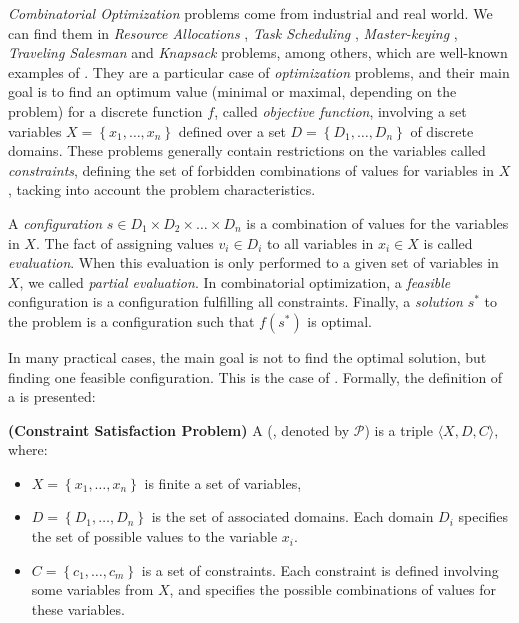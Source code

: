 \textit{Combinatorial Optimization} problems come from industrial and real world. We can find them in {\it Resource Allocations} \cite{Akplogan2011}, \textit{Task Scheduling} \cite{Sibbesen2008}, \textit{Master-keying} \cite{Espelage2000}, \textit{Traveling Salesman} and \textit{Knapsack} problems, among others, which are well-known examples of \cops{} \cite{Smith2005}. They are a particular case of \textit{optimization} problems, and their main goal is to find an optimum value (minimal or maximal, depending on the problem) for a discrete function $f$, called \textit{objective function}, involving a set variables $X = \left\{x_1, \dots, x_n\right\}$ defined over a set $D = \left\{D_1, \dots, D_n\right\}$ of discrete domains. These problems generally contain restrictions on the variables called \textit{constraints}, defining the set of forbidden combinations of values for variables in $X$, tacking into account the problem characteristics.

A \textit{configuration} $s\in D_1\times D_2\times\dots\times D_n$ is a combination of values for the variables in $X$. The fact of assigning values $v_i \in D_i$ to all variables in $x_i \in X$ is called \textit{evaluation}. When this evaluation is only performed to a given set of variables in $X$, we called \textit{partial evaluation}. In combinatorial optimization, a \textit{feasible} configuration is a configuration fulfilling all constraints. Finally, a \textit{solution} $s^*$ to the problem is a configuration such that $f(s^*)$ is optimal.

In many practical cases, the main goal is not to find the optimal solution, but finding one feasible configuration. This is the case of \CSPs. Formally, the definition of a \csp{} is presented: 

\begin{definition}{\bf (Constraint Satisfaction Problem)}
\label{def:csp}
A \CSP{} (\csp, denoted by $\mathcal{P}$) is a triple $\langle X,D,C \rangle$, where:
\begin{itemize}
\item $X = \left\{x_1,\ldots,x_n\right\}$ is finite a set of variables,
\item $D = \left\{D_1,\ldots, D_n\right\}$ is the set of associated domains. Each domain $D_i$ specifies the set of possible values to the variable $x_i$. %
\item $C = \left\{c_1,\ldots, c_m\right\}$ is a set of constraints. Each constraint is defined involving some variables from $X$, and specifies the possible combinations of values for these variables.
\end{itemize}
\end{definition}

